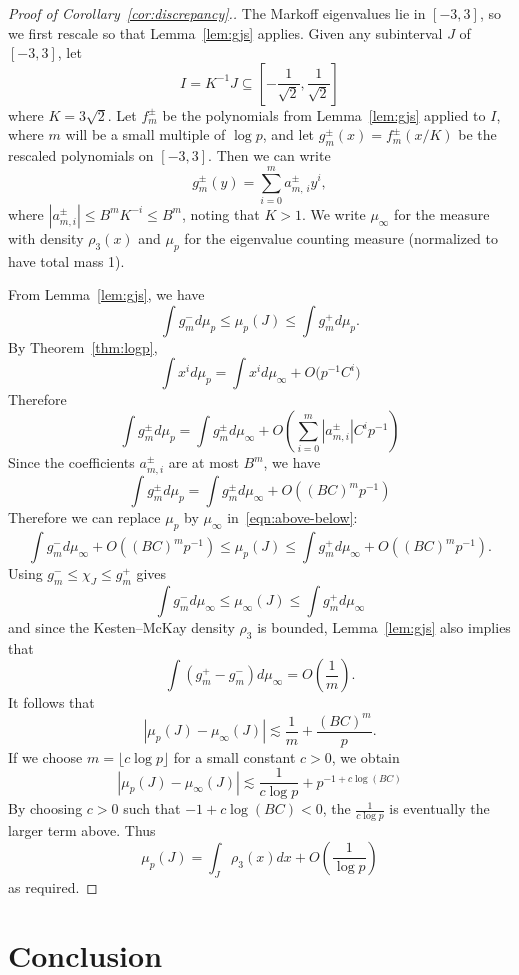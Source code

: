 \documentclass[AHL, Unicode, longabstracts, published]{cedram}
\begin{document}
\begin{proof}[{Proof of Corollary~\ref{cor:discrepancy}.}]
The Markoff eigenvalues lie in $[-3,3]$, so we first rescale so that Lemma~\ref{lem:gjs} applies. Given any subinterval $J$ of $[-3,3]$, let
\[
I = K^{-1} J \subseteq \left[-\frac{1}{\sqrt{2}}, \frac{1}{\sqrt{2}} \right]
\]
where $K = 3\sqrt{2}$. Let $f_m^{\pm}$ be the polynomials from Lemma~\ref{lem:gjs} applied to $I$, where $m$ will be a small multiple of $\log{p}$, and let $g_m^\pm(x) = f_m^{\pm}(x/K)$ be the rescaled polynomials on $[-3,3]$. Then we can write
\[
g_m^{\pm}(y) = \sum_{i=0}^m a_{m,\,i}^{\pm} y^i,
\]
where $|a_{m,i}^{\pm}| \leq B^m K^{-i} \leq B^m$, noting that $K > 1$. We write $\mu_{\infty}$ for the measure with density $\rho_3(x)$ and $\mu_p$ for the eigenvalue counting measure (normalized to have total mass 1).

From Lemma~\ref{lem:gjs}, we have
\begin{equation}\label{eqn:above-below}
\int g_m^- d\mu_p \leq \mu_p(J) \leq \int g_m^+ d\mu_p.
\end{equation}
By Theorem~\ref{thm:logp},
\[
\int x^i d\mu_p = \int x^i d\mu_{\infty} + O\big(p^{-1} C^i \big)
\]
Therefore
\[
\int g_m^{\pm} d\mu_p = \int g_m^{\pm} d\mu_{\infty} + O\left(\sum_{i=0}^m \left|a_{m,i}^{\pm}\right| C^i p^{-1} \right)
\]
Since the coefficients $a_{m,i}^{\pm}$ are at most $B^m$, we have
\[
\int g_m^{\pm} d\mu_p = \int g_m^{\pm} d\mu_{\infty} + O\left((BC)^m p^{-1} \right)
\]
Therefore we can replace $\mu_p$ by $\mu_{\infty}$ in~\eqref{eqn:above-below}:
\[
\int g_m^- d\mu_{\infty} + O\left((BC)^m p^{-1} \right) \leq \mu_p(J) \leq \int g_m^+ d\mu_{\infty} + O\left((BC)^m p^{-1} \right).
\]
Using $g_m^- \leq \chi_J \leq g_m^+$ gives
\[
\int g_m^- d\mu_{\infty} \leq \mu_{\infty}(J) \leq \int g_m^+ d\mu_{\infty}
\]
and since the Kesten--McKay density $\rho_3$ is bounded, Lemma~\ref{lem:gjs} also implies that
\[
\int (g_m^+ - g_m^-) d\mu_{\infty} = O\left(\frac{1}{m} \right).
\]
It follows that
\[
|\mu_p(J) - \mu_{\infty}(J) | \lesssim \frac{1}{m} + \frac{(BC)^m}{p}.
\]
If we choose $m = \lfloor c \log{p} \rfloor$ for a small constant $c > 0$, we obtain
\[
|\mu_p(J) - \mu_{\infty}(J) | \lesssim \frac{1}{c \log{p}} + p^{-1+c\log(B C)}
\]
By choosing $c>0$ such that $-1 + c\log(B C)<0$, the $ \frac{1}{c \log{p}}$ is eventually the larger term above. Thus
\[
\mu_{p}(J) =\int_{J} \rho_{3}(x) dx+O\left(\frac{1}{\log p} \right)
\]
as required.
\end{proof}

\section{Conclusion} \label{sec:conc}
\end{document}

